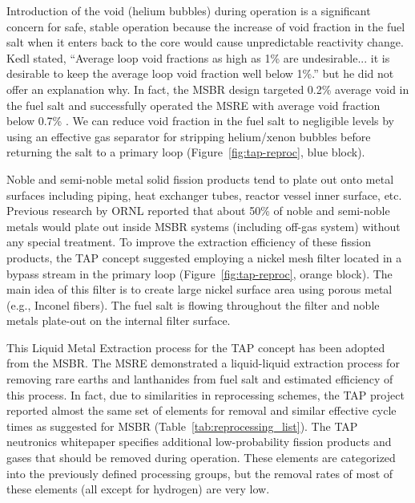 Introduction of the void (helium bubbles) during operation is a significant 
concern for safe, stable operation because the increase of void fraction in 
the fuel salt when it enters back to the core would cause unpredictable 
reactivity change. Kedl stated, ``Average loop void fractions as high as 1\% 
are undesirable... it is desirable to keep the average loop void fraction well 
below 1\%.''\cite{robertson_conceptual_1971} but he did not offer an 
explanation why. In fact, the \gls{MSBR} design targeted 0.2\% average void in 
the fuel salt \cite{robertson_conceptual_1971} and successfully operated the 
\gls{MSRE} with average void fraction below 0.7\% \cite{compere_fission_1975}.
We can reduce void fraction in the fuel salt to negligible levels by using an 
effective gas separator for stripping helium/xenon bubbles before returning 
the salt to a primary loop (Figure~\ref{fig:tap-reproc}, blue block). 

Noble and semi-noble metal solid fission products tend to plate out onto metal 
surfaces including piping, heat exchanger tubes, reactor vessel inner surface, 
etc. Previous research by \gls{ORNL} \cite{robertson_conceptual_1971} reported 
that about 50\% of noble and semi-noble metals would plate out inside 
\gls{MSBR} systems (including off-gas system) without any special treatment. 
To improve the extraction efficiency of these fission products, the \gls{TAP} 
concept suggested employing a nickel mesh filter located in a bypass stream in 
the primary loop (Figure~\ref{fig:tap-reproc}, orange block). The main idea of 
this filter is to create large nickel surface area using porous metal (e.g., 
Inconel fibers). The fuel salt is flowing throughout the filter and noble 
metals plate-out on the internal filter surface. 

This Liquid Metal Extraction process for the \gls{TAP} concept has been 
adopted from the \gls{MSBR}. The \gls{MSRE} demonstrated a liquid-liquid 
extraction process for removing rare earths and lanthanides from fuel salt and 
estimated efficiency of this process. 
In fact, due to similarities in reprocessing schemes, the \gls{TAP} project 
reported almost the same set of elements for removal and similar effective 
cycle times as suggested for \gls{MSBR} (Table~\ref{tab:reprocessing_list}). 
The \gls{TAP} neutronics whitepaper specifies additional low-probability 
fission products and gases that should be removed during operation. These 
elements are categorized into the previously defined processing groups, but 
the removal rates of most of these elements (all except for hydrogen) 
are very low.


